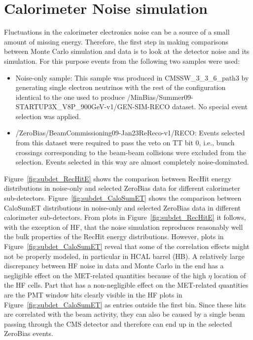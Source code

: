 \section{Calorimeter Noise simulation}
\label{sc:CaloNoise}

Fluctuations in the calorimeter electronics noise can be a source of a small amount of missing energy. Therefore, the first step
in making comparisons between Monte Carlo simulation and data is to look at the detector noise and its simulation. For this purpose
events from the following two samples were used:

\begin{itemize}
  \item Noise-only sample: \newline
This sample was produced in CMSSW\_3\_3\_6\_path3 by generating single electron neutrinos with the rest of the configuration identical to the one used to
produce /MinBias/Summer09-STARTUP3X\_V8P\_900GeV-v1/GEN-SIM-RECO dataset. No special event selection was applied.

  \item /ZeroBias/BeamCommissioning09-Jan23ReReco-v1/RECO: \newline
Events selected from this dataset were required to pass the veto on TT bit 0, i.e., bunch crossings corresponding to the beam-beam
collisions were excluded from the selection. Events selected in this way are almost completely noise-dominated.
\end{itemize}

Figure~\ref{fig:subdet_RecHitE} shows the comparison between RecHit energy distributions in noise-only and selected ZeroBias data for different
calorimeter sub-detectors. Figure~\ref{fig:subdet_CaloSumET} shows the comparison between CaloSumET distributions in noise-only and selected 
ZeroBias data in different calorimeter sub-detectors. From plots in Figure~\ref{fig:subdet_RecHitE} it follows, with the exception of HF, that
the noise simulation reproduces reasonably well the bulk properties of the RecHit energy distributions. However, plots in 
Figure~\ref{fig:subdet_CaloSumET} reveal that some of the correlation effects might not be properly modeled, in particular in HCAL barrel (HB).
A relatively large discrepancy between HF noise in data and Monte Carlo in the end has a negligible effect on the MET-related quantities 
because of the high $\eta$ location of the HF cells. Part that has a non-negligible effect on the MET-related quantities are the PMT window hits
clearly visible in the HF plots in Figure~\ref{fig:subdet_CaloSumET} as entries outside the first bin. Since these
 hits are correlated with the beam activity, they can also be caused by a single beam passing through the CMS detector and therefore can end up
in the selected ZeroBias events.

